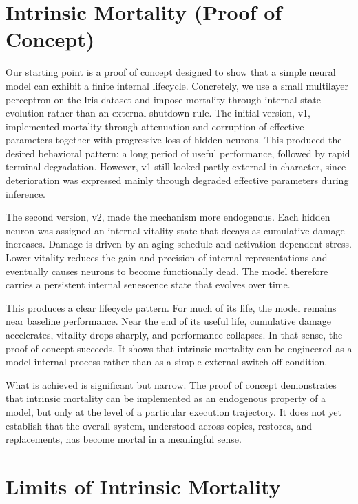\documentclass[11pt]{article}
\begin{document}
\newpage
\section{Intrinsic Mortality (Proof of Concept)}

Our starting point is a proof of concept designed to show that a simple neural model can exhibit a finite internal lifecycle. Concretely, we use a small multilayer perceptron on the Iris dataset and impose mortality through internal state evolution rather than an external shutdown rule. The initial version, v1, implemented mortality through attenuation and corruption of effective parameters together with progressive loss of hidden neurons. This produced the desired behavioral pattern: a long period of useful performance, followed by rapid terminal degradation. However, v1 still looked partly external in character, since deterioration was expressed mainly through degraded effective parameters during inference.

The second version, v2, made the mechanism more endogenous. Each hidden neuron was assigned an internal vitality state that decays as cumulative damage increases. Damage is driven by an aging schedule and activation-dependent stress. Lower vitality reduces the gain and precision of internal representations and eventually causes neurons to become functionally dead. The model therefore carries a persistent internal senescence state that evolves over time.

This produces a clear lifecycle pattern. For much of its life, the model remains near baseline performance. Near the end of its useful life, cumulative damage accelerates, vitality drops sharply, and performance collapses. In that sense, the proof of concept succeeds. It shows that intrinsic mortality can be engineered as a model-internal process rather than as a simple external switch-off condition.

What is achieved is significant but narrow. The proof of concept demonstrates that intrinsic mortality can be implemented as an endogenous property of a model, but only at the level of a particular execution trajectory. It does not yet establish that the overall system, understood across copies, restores, and replacements, has become mortal in a meaningful sense.

\newpage
\section{Limits of Intrinsic Mortality}
\end{document}
